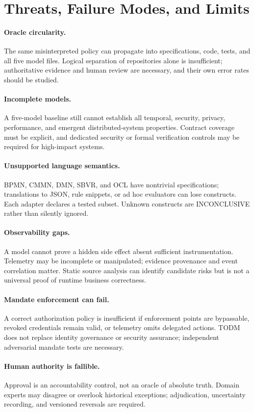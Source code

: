 \documentclass[11pt,a4paper]{article}
\newcommand{\INC}{\textsf{INCONCLUSIVE}}
\begin{document}
\section{Threats, Failure Modes, and Limits}
\paragraph{Oracle circularity.} The same misinterpreted policy can propagate into specifications, code, tests, and all five model files. Logical separation of repositories alone is insufficient; authoritative evidence and human review are necessary, and their own error rates should be studied.
\paragraph{Incomplete models.} A five-model baseline still cannot establish all temporal, security, privacy, performance, and emergent distributed-system properties. Contract coverage must be explicit, and dedicated security or formal verification controls may be required for high-impact systems.
\paragraph{Unsupported language semantics.} BPMN, CMMN, DMN, SBVR, and OCL have nontrivial specifications; translations to JSON, rule snippets, or ad hoc evaluators can lose constructs. Each adapter declares a tested subset. Unknown constructs are \INC{} rather than silently ignored.
\paragraph{Observability gaps.} A model cannot prove a hidden side effect absent sufficient instrumentation. Telemetry may be incomplete or manipulated; evidence provenance and event correlation matter. Static source analysis can identify candidate risks but is not a universal proof of runtime business correctness.
\paragraph{Mandate enforcement can fail.} A correct authorization policy is insufficient if enforcement points are bypassable, revoked credentials remain valid, or telemetry omits delegated actions. TODM does not replace identity governance or security assurance; independent adversarial mandate tests are necessary.
\paragraph{Human authority is fallible.} Approval is an accountability control, not an oracle of absolute truth. Domain experts may disagree or overlook historical exceptions; adjudication, uncertainty recording, and versioned reversals are required.
\end{document}
